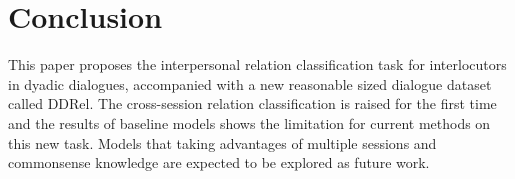 \section{Conclusion}

This paper proposes the interpersonal relation classification task for interlocutors in dyadic dialogues, accompanied with a new reasonable sized dialogue dataset called DDRel. The cross-session relation classification is raised for the first time and the results of baseline models shows the limitation for current methods on this new task. Models that taking advantages of multiple sessions and commonsense knowledge are expected to be explored as future work.
